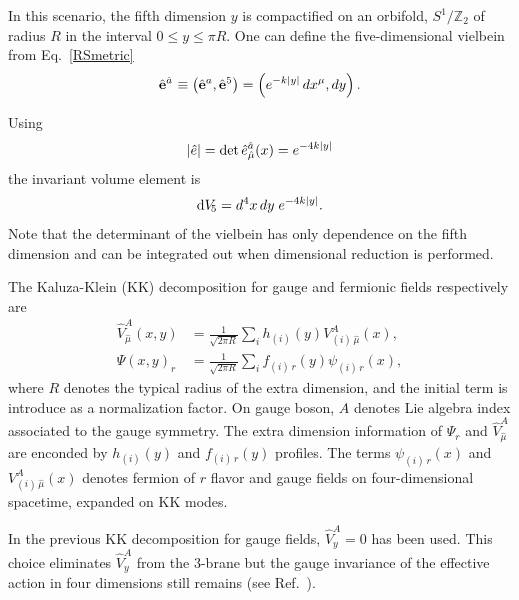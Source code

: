 In this scenario, the fifth dimension $y$ is compactified on an orbifold, $S^1/\mathbb{Z}_2$ of radius $R$ in the interval $0\leq y\leq \pi R$. One can define the five-dimensional vielbein from Eq.~\eqref{RSmetric} 
\begin{align}
  \vifhn{a}{} \equiv \left(\vifh^{a},\vifh^5\right) = \left(e^{-k|y|}\,dx^\mu,dy\right). 
\end{align}

Using
\begin{align}
|\hat{e}| = \det{\vih^{\hat{a}}_{\hat{\mu}}(x)} = e^{-4k|y|} 
\end{align}
the invariant volume element is %
\begin{align}
   \dv[5]  = d^4x\, dy\;e^{-4k|y|}.
\end{align}
Note that the determinant of the vielbein has only dependence on the fifth dimension and can be integrated out when dimensional reduction is performed. 

The Kaluza-Klein (KK) decomposition for gauge and fermionic fields respectively are
\begin{align}
  \label{KKgaugedecomp}
  \hat{V}_{\hat{\mu}}^A(x,y) &= \frac{1}{\sqrt{2\pi R}}\sum_{i}h_{(i)}(y)V_{(i)\,\hat{\mu}}^{A}(x), \\
  \label{KKspindecomp}
  \Psi(x,y)_r &= \frac{1}{\sqrt{2\pi R}}\sum_{i}f_{(i)\,r}(y)\psi_{(i)\,r}(x),
\end{align}
where $R$ denotes the typical radius of the extra dimension, and the initial term is introduce as a normalization factor. On gauge boson, $A$ denotes Lie algebra index associated to the gauge symmetry. The extra dimension information of $\Psi_r$ and $\hat{V}_{\hat{\mu}}^A$ are enconded by $h_{(i)}(y)$ and $f_{(i)\,r}(y)$ profiles. The terms $\psi_{(i)\,r}(x)$ and $V_{(i)\,\hat{\mu}}^{A}(x)$ denotes fermion of $r$ flavor and gauge fields on four-dimensional spacetime, expanded on KK modes. 

In the previous KK decomposition for gauge fields, $\hat{V}_y^A=0$ has been used. This choice eliminates $\hat{V}_y^A$ from the 3-brane but the gauge invariance of the effective action in four dimensions still remains (see Ref.~\cite{Davoudiasl:1999tf}). 

